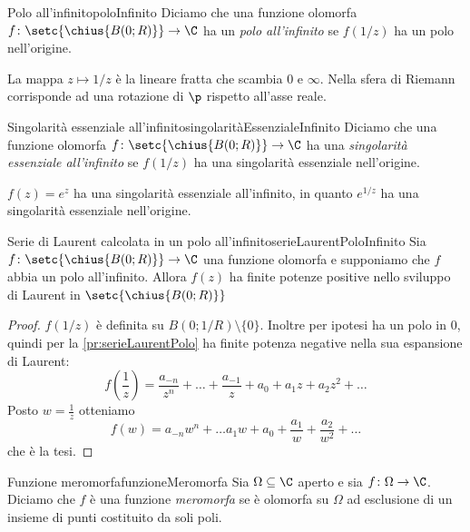 \begin{defn}{Polo all'infinito}{poloInfinito}
	Diciamo che una funzione olomorfa \(f\colon \setc{\chius{B(0;R)}} \to \C\) ha un \emph{polo all'infinito} se \(f(1/z)\) ha un polo nell'origine.
\end{defn}

\begin{oss}
	La mappa \(z\mapsto 1/z\) è la lineare fratta che scambia \(0\) e \(\infty\).
	Nella sfera di Riemann corrisponde ad una rotazione di \(\p\) rispetto all'asse reale.
\end{oss}

\begin{defn}{Singolarità essenziale all'infinito}{singolaritàEssenzialeInfinito}
	Diciamo che una funzione olomorfa \(f\colon \setc{\chius{B(0;R)}} \to \C\) ha una \emph{singolarità essenziale all'infinito} se \(f(1/z)\) ha una singolarità essenziale nell'origine.
\end{defn}

\begin{ese}
	\(f(z)=e^z\) ha una singolarità essenziale all'infinito, in quanto \(e^{1/z}\) ha una singolarità essenziale nell'origine.
\end{ese}

\begin{prop}{Serie di Laurent calcolata in un polo all'infinito}{serieLaurentPoloInfinito}
	Sia \(f\colon \setc{\chius{B(0;R)}} \to \C\) una funzione olomorfa e supponiamo che \(f\) abbia un polo all'infinito.
	Allora \(f(z)\) ha finite potenze positive nello sviluppo di Laurent in \(\setc{\chius{B(0;R)}}\)
\end{prop}

\begin{proof}
	\(f(1/z)\) è definita su \(B(0;1/R)\setminus\{0\}\). Inoltre per ipotesi ha un polo in \(0\), quindi per la \autoref{pr:serieLaurentPolo} ha finite potenza negative nella sua espansione di Laurent:
	\[
		f \left( \frac{1}{z} \right) = \frac{a_{-n}}{z^n}+\ldots+\frac{a_{-1}}{z}+a_0+a_1 z+ a_2 z^2 + \ldots
	\]
	Posto \(w=\frac{1}{z}\) otteniamo
	\[
		f(w) = a_{-n}w^n + \ldots a_1 w + a_0 + \frac{a_1}{w}+ \frac{a_2}{w^2}+\ldots
	\]
	che è la tesi.
\end{proof}

\begin{defn}{Funzione meromorfa}{funzioneMeromorfa}
	Sia \(\Omega\subseteq \C\) aperto e sia \(f\colon \Omega \to \C\).
	Diciamo che \(f\) è una funzione \emph{meromorfa} se è olomorfa su \(\Omega\) ad esclusione di un insieme di punti costituito da soli poli.
\end{defn}

